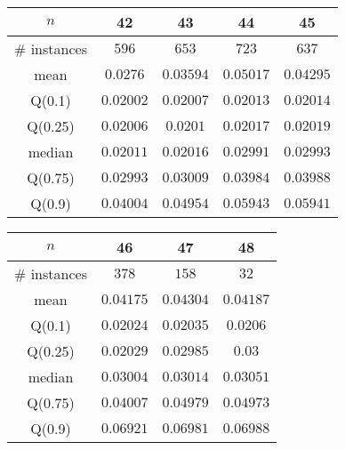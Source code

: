 \begin{tabular}{c|cccc} 
\hline 
$n$ & 42 & 43 & 44 & 45 \tabularnewline 
\hline 
\hline 
\# instances & $596$ & $653$ & $723$ & $637$ \tabularnewline 
mean & $0.0276$ & $0.03594$ & $0.05017$ & $0.04295$ \tabularnewline 
Q(0.1) & $0.02002$ & $0.02007$ & $0.02013$ & $0.02014$ \tabularnewline 
Q(0.25) & $0.02006$ & $0.0201$ & $0.02017$ & $0.02019$ \tabularnewline 
median & $0.02011$ & $0.02016$ & $0.02991$ & $0.02993$ \tabularnewline 
Q(0.75) & $0.02993$ & $0.03009$ & $0.03984$ & $0.03988$ \tabularnewline 
Q(0.9) & $0.04004$ & $0.04954$ & $0.05943$ & $0.05941$ \tabularnewline 
\hline 
\end{tabular} 
\medskip{} 

\begin{tabular}{c|ccc} 
\hline 
$n$ & 46 & 47 & 48 \tabularnewline 
\hline 
\hline 
\# instances & $378$ & $158$ & $32$ \tabularnewline 
mean & $0.04175$ & $0.04304$ & $0.04187$ \tabularnewline 
Q(0.1) & $0.02024$ & $0.02035$ & $0.0206$ \tabularnewline 
Q(0.25) & $0.02029$ & $0.02985$ & $0.03$ \tabularnewline 
median & $0.03004$ & $0.03014$ & $0.03051$ \tabularnewline 
Q(0.75) & $0.04007$ & $0.04979$ & $0.04973$ \tabularnewline 
Q(0.9) & $0.06921$ & $0.06981$ & $0.06988$ \tabularnewline 
\hline 
\end{tabular} 
\medskip{} 


